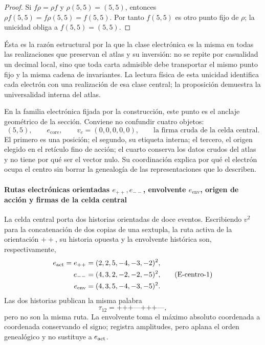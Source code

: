 \begin{proof}
Si \(f\rho=\rho f\) y \(\rho(5,5)=(5,5)\), entonces
\(\rho f(5,5)=f\rho(5,5)=f(5,5)\). Por tanto \(f(5,5)\) es otro punto fijo
de \(\rho\); la unicidad obliga a \(f(5,5)=(5,5)\).
\end{proof}

Ésta es la razón estructural por la que la clase electrónica es la misma en
todas las realizaciones que preservan el atlas y su inversión: no se repite
por casualidad un decimal local, sino que toda carta admisible debe
transportar el mismo punto fijo y la misma cadena de invariantes. La lectura
física de esta unicidad identifica cada electrón con una realización de esa
clase central; la proposición demuestra la universalidad interna del atlas.

En la familia electrónica fijada por la construcción, este punto es el anclaje
geométrico de la sección. Conviene no confundir cuatro objetos:
\[
 (5,5),\qquad
 e_{\mathrm{core}},\qquad
 v_e=(0,0,0,0,0),\qquad
 \text{la firma cruda de la celda central}.
\]
El primero es una posición; el segundo, su etiqueta interna; el tercero,
el origen elegido en el retículo fino de acción; el cuarto conserva los
datos crudos del atlas y no tiene por qué ser el vector nulo. Su
coordinación explica por qué el electrón ocupa el centro sin borrar la
genealogía de las representaciones que lo describen.

\paragraph{Rutas electrónicas orientadas \(e_{++},e_{--}\), envolvente \(e_{\mathrm{env}}\), origen de acción y firmas de la celda central}
La celda central porta dos historias orientadas de doce eventos. Escribiendo
\(v^2\) para la concatenación de dos copias de una sextupla, la ruta activa
de la orientación \({++}\), su historia opuesta y la envolvente histórica
son, respectivamente,
\[
\begin{aligned}
 e_{\rm act}=e_{++}
   &=(2,2,5,-4,-3,-2)^2,\\
 e_{--}
   &=(4,3,2,-2,-2,-5)^2,\\
 e_{\rm env}
   &=(4,3,5,-4,-3,-5)^2.
\end{aligned}
\tag{E-centro-1}\label{eq:electron-rutas-finas-rev8}
\]
Las dos historias publican la misma palabra
\[
 \tau_{12}=\texttt{+++---+++---},
\]
pero no son la misma ruta. La envolvente toma el máximo absoluto
coordenada a coordenada conservando el signo; registra amplitudes, pero
aplana el orden genealógico y no sustituye a \(e_{\rm act}\).

